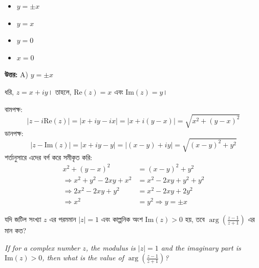 \documentclass[12pt, a4paper]{article}
\begin{document}
\begin{itemize}[label={}, leftmargin=1cm, itemsep=0.5em]
    \item[\textbf{A)}] $y = \pm x$
    \item[\textbf{B)}] $y = x$
    \item[\textbf{C)}] $y = 0$
    \item[\textbf{D)}] $x = 0$
\end{itemize}

\vspace{0.5em}
\begin{tcolorbox}[answerbox]
    \textbf{\color{success} উত্তর:} A) $y = \pm x$
\end{tcolorbox}
\vspace{1em}

\begin{tcolorbox}[solutionbox={সমাধান (Solution)}]
    \noindent
    ধরি, $z = x + iy$। তাহলে, $\text{Re}(z) = x$ এবং $\text{Im}(z) = y$।
    
    বামপক্ষ: 
    \[ |z - i\text{Re}(z)| = |x + iy - ix| = |x + i(y-x)| = \sqrt{x^2 + (y-x)^2} \]
    ডানপক্ষ: 
    \[ |z - \text{Im}(z)| = |x + iy - y| = |(x-y) + iy| = \sqrt{(x-y)^2 + y^2} \]
    শর্তানুসারে এদের বর্গ করে সমীকৃত করি:
    \begin{align*}
        x^2 + (y-x)^2 &= (x-y)^2 + y^2 \\
        \Rightarrow x^2 + y^2 - 2xy + x^2 &= x^2 - 2xy + y^2 + y^2 \\
        \Rightarrow 2x^2 - 2xy + y^2 &= x^2 - 2xy + 2y^2 \\
        \Rightarrow x^2 &= y^2 \Rightarrow y = \pm x
    \end{align*}
\end{tcolorbox}

\vspace{1em}

\begin{tcolorbox}[questionbox={প্রশ্ন (Question) 14}]
    \noindent
    যদি জটিল সংখ্যা $z$ এর পরমমান $|z| = 1$ এবং কাল্পনিক অংশ $\text{Im}(z) > 0$ হয়, তবে $\arg\left(\frac{z-1}{z+1}\right)$ এর মান কত?
    
    \vspace{0.8em}
    \begin{english}
    \noindent\textit{\color{darkgray}
    If for a complex number $z$, the modulus is $|z| = 1$ and the imaginary part is $\text{Im}(z) > 0$, then what is the value of $\arg\left(\frac{z-1}{z+1}\right)$?
    }
    \end{english}
\end{tcolorbox}
\end{document}
